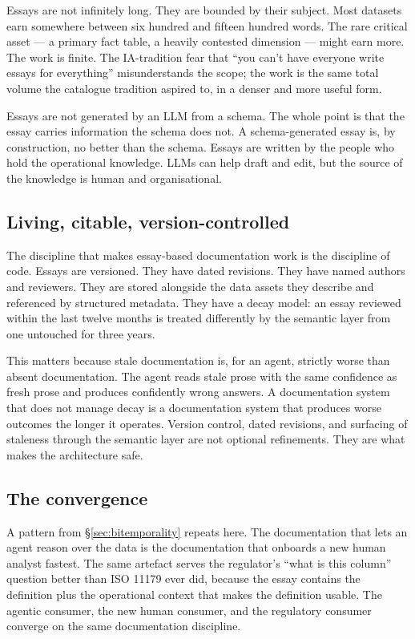 \documentclass[11pt,a4paper]{article}
\begin{document}
Essays are not infinitely long. They are bounded by their subject. Most datasets earn somewhere between six hundred and fifteen hundred words. The rare critical asset --- a primary fact table, a heavily contested dimension --- might earn more. The work is finite. The IA-tradition fear that ``you can't have everyone write essays for everything'' misunderstands the scope; the work is the same total volume the catalogue tradition aspired to, in a denser and more useful form.

Essays are not generated by an LLM from a schema. The whole point is that the essay carries information the schema does not. A schema-generated essay is, by construction, no better than the schema. Essays are written by the people who hold the operational knowledge. LLMs can help draft and edit, but the source of the knowledge is human and organisational.

\subsection{Living, citable, version-controlled}

The discipline that makes essay-based documentation work is the discipline of code. Essays are versioned. They have dated revisions. They have named authors and reviewers. They are stored alongside the data assets they describe and referenced by structured metadata. They have a decay model: an essay reviewed within the last twelve months is treated differently by the semantic layer from one untouched for three years.

This matters because stale documentation is, for an agent, strictly worse than absent documentation. The agent reads stale prose with the same confidence as fresh prose and produces confidently wrong answers. A documentation system that does not manage decay is a documentation system that produces worse outcomes the longer it operates. Version control, dated revisions, and surfacing of staleness through the semantic layer are not optional refinements. They are what makes the architecture safe.

\subsection{The convergence}

A pattern from \S\ref{sec:bitemporality} repeats here. The documentation that lets an agent reason over the data is the documentation that onboards a new human analyst fastest. The same artefact serves the regulator's ``what is this column'' question better than ISO 11179 ever did, because the essay contains the definition plus the operational context that makes the definition usable. The agentic consumer, the new human consumer, and the regulatory consumer converge on the same documentation discipline.
\end{document}
